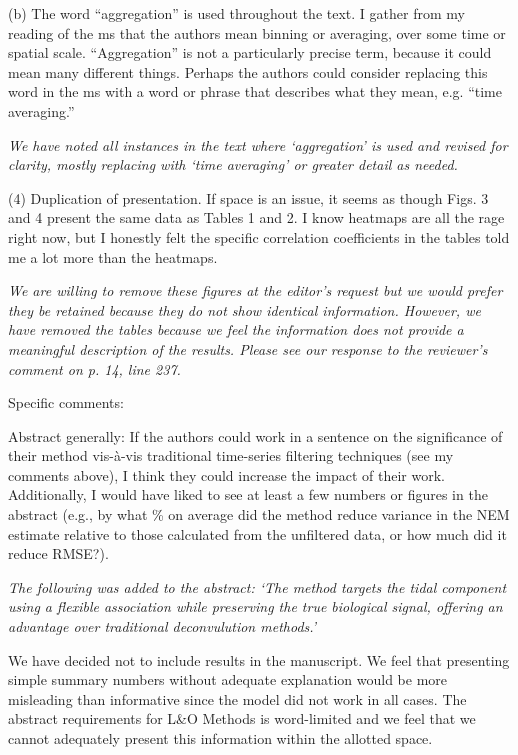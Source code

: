 \documentclass[letterpaper,12pt]{article}\usepackage[]{graphicx}\usepackage[]{color}
\begin{document}
(b) The word “aggregation” is used throughout the text. I gather from my reading of the ms that the authors mean binning or averaging, over some time or spatial scale. “Aggregation” is not a particularly precise term, because it could mean many different things. Perhaps the authors could consider replacing this word in the ms with a word or phrase that describes what they mean, e.g. “time averaging.”

{\it We have noted all instances in the text where `aggregation' is used and revised for clarity, mostly replacing with `time averaging' or greater detail as needed.}

(4) Duplication of presentation. If space is an issue, it seems as though Figs. 3 and 4 present the same data as Tables 1 and 2. I know heatmaps are all the rage right now, but I honestly felt the specific correlation coefficients in the tables told me a lot more than the heatmaps.

{\it We are willing to remove these figures at the editor’s request but we would prefer they be retained because they do not show identical information.  However, we have removed the tables because we feel the information does not provide a meaningful description of the results.  Please see our response to the reviewer’s comment on p. 14, line 237. 
}

Specific comments:

Abstract generally: If the authors could work in a sentence on the significance of their method vis-à-vis traditional time-series filtering techniques (see my comments above), I think they could increase the impact of their work. Additionally, I would have liked to see at least a few numbers or figures in the abstract (e.g., by what \% on average did the method reduce variance in the NEM estimate relative to those calculated from the unfiltered data, or how much did it reduce RMSE?).

{\it The following was added to the abstract: `The method targets the tidal component using a flexible association while preserving the true biological signal, offering an advantage over traditional deconvulution methods.'

We have decided not to include results in the manuscript.  We feel that presenting simple summary numbers without adequate explanation would be more misleading than informative since the model did not work in all cases.  The abstract requirements for L\&O Methods is word-limited and we feel that we cannot adequately present this information within the allotted space.
}
\end{document}
